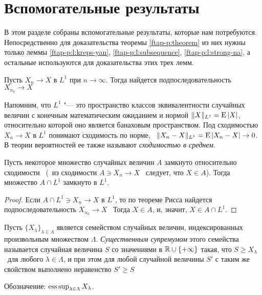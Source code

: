 \section{Вспомогательные результаты}

В этом разделе собраны вспомогательные результаты, которые нам потребуются.
Непосредственно для доказательства теоремы \ref{ftap-p:theorem} из них нужны только леммы \ref{ftap-p:l:kreps-yan}, \ref{ftap-p:l:subsequence}, \ref{ftap-p:l:strong-na}, а остальные используются для доказательства этих трех лемм.

\begin{lemma}
Пусть $X_n\to X$ в $L^1$ при $n\to\infty$.
Тогда найдется подпоследовательность $X_{n_k} \to X$ \as
\end{lemma}
\begin{remark}
Напомним, что $L^1$ "--- это пространство классов эквивалентности случайных величин с конечным математическим ожиданием и нормой $\|X\|_{L^1} = \operatorname{E}|X|$, относительно которой оно является банаховым пространством.
Под сходимостью $X_n\to X$ в $L^1$ понимают сходимость по норме, \te\ $\|X_n-X\|_{L^1} = \operatorname{E}|X_n-X| \to 0$.
В теории вероятностей ее также называют \emph{сходимостью в среднем}.
\end{remark}

\begin{corollary}
Пусть некоторое множество случайных величин $A$ замкнуто относительно сходимости \as\ (\te\ из сходимости $A\ni X_n \to X$ \as\ следует, что $X\in A$).
Тогда множество $A \cap L^1$ замкнуто в $L^1$.
\end{corollary}

\begin{proof}
Если $A \cap L^1 \ni X_n \to X$ в $L^1$, то по теореме Рисса найдется подпоследовательность $X_{n_k} \to X$ \as\
Тогда $X\in A$, и, значит, $X\in A\cap L^1$.
\end{proof}
  
\begin{definition}
Пусть $\{X_\lambda\}_{\lambda\in\Lambda}$ является семейством случайных величин, индексированных произвольным множеством $\Lambda$. \emph{Существенным супремумом} этого семейства называется случайная величина $S$ со значениями в $\mathbb{R}\cup\{+\infty\}$ такая, что $S \ge X_\lambda$ \as\ для любого $\lambda\in\Lambda$, и при этом для любой случайной величины $S'$ с таким же свойством выполнено неравенство $S'\ge S$ \as

Обозначение: $\operatorname{ess\,sup}_{\lambda\in\Lambda} X_\lambda$.
\end{definition}

